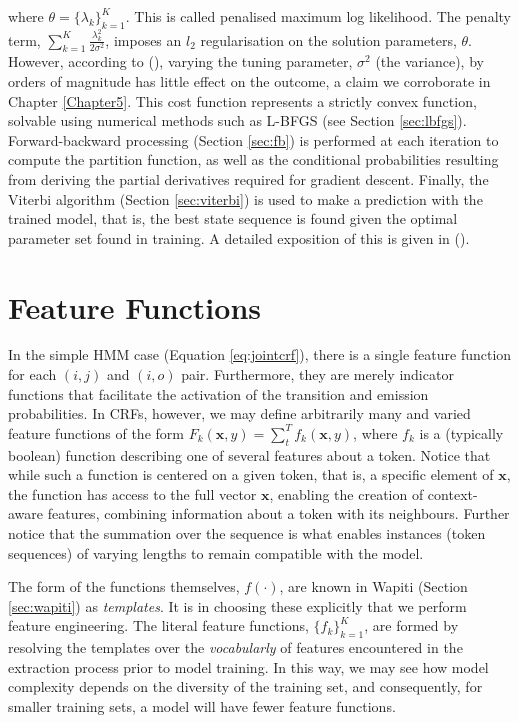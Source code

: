 where $\theta = \{\lambda_k\}_{k=1}^K$. This is called penalised maximum log likelihood. The penalty term, $\sum_{k=1}^K\frac{\lambda_k^2}{2\sigma^2}$, imposes an $l_2$ regularisation on the solution parameters, $\theta$. However, according to (\cite{mccallum2000maximum}), varying the tuning parameter, $\sigma^2$ (the variance), by orders of magnitude has little effect on the outcome, a claim we corroborate in Chapter \ref{Chapter5}. This cost function represents a strictly convex function, solvable using numerical methods such as L-BFGS (see Section \ref{sec:lbfgs}). Forward-backward processing (Section \ref{sec:fb}) is performed at each iteration to compute the partition function, as well as the conditional probabilities resulting from deriving the partial derivatives required for gradient descent. Finally, the Viterbi algorithm (Section \ref{sec:viterbi}) is used to make a prediction with the trained model, that is, the best state sequence is found given the optimal parameter set found in training. A detailed exposition of this is given in (\cite{mccallum2000maximum}).

\section{Feature Functions}
\label{sec:featurefunctions}

In the simple HMM case (Equation \ref{eq:jointcrf}), there is a single feature function for each $(i, j)$ and $(i, o)$ pair. Furthermore, they are merely indicator functions that facilitate the activation of the transition and emission probabilities. In CRFs, however, we may define arbitrarily many and varied feature functions of the form $F_k(\mathbf{x}, y) = \sum_t^T f_k(\mathbf{x}, y)$, where $f_k$ is a (typically boolean) function describing one of several features about a token. Notice that while such a function is centered on a given token, that is, a specific element of $\mathbf{x}$, the function has access to the full vector $\mathbf{x}$, enabling the creation of context-aware features, combining information about a token with its neighbours. Further notice that the summation over the sequence is what enables instances (token sequences) of varying lengths to remain compatible with the model.

The form of the functions themselves, $f(\cdot)$, are known in Wapiti (Section \ref{sec:wapiti}) as \emph{templates}. It is in choosing these explicitly that we perform feature engineering. The literal feature functions, $\{f_k\}_{k=1}^K$, are formed by resolving the templates over the \emph{vocabularly} of features encountered in the extraction process prior to model training. In this way, we may see how model complexity depends on the diversity of the training set, and consequently, for smaller training sets, a model will have fewer feature functions. 

